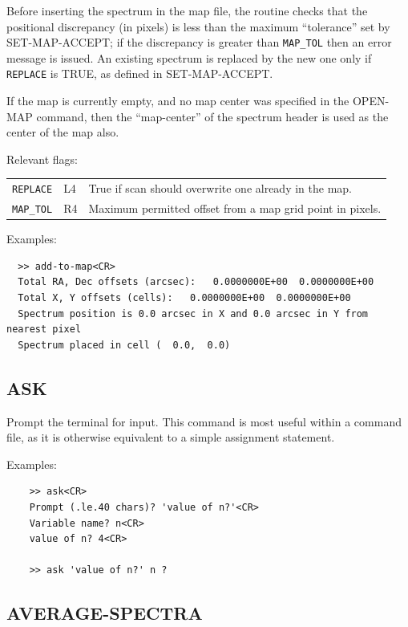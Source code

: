 \documentclass[11pt,twoside]{report}
\begin{document}
Before inserting the spectrum in the map file, the routine checks that the
positional discrepancy (in pixels) is less than the maximum ``tolerance''
set by SET-MAP-ACCEPT; if the discrepancy is greater than \verb+MAP_TOL+
then an error message is issued. An existing spectrum is replaced by the
new one only if \verb+REPLACE+ is TRUE, as defined in SET-MAP-ACCEPT.

If the map is currently empty, and no map center was specified in the
OPEN-MAP command, then the ``map-center'' of the spectrum header is used
as the center of the map also.

Relevant flags:\\
\begin{tabular}{lll}\index{REPLACE@\verb+REPLACE+}\index{MAP_TOL@\verb+MAP_TOL+}
  \verb+REPLACE+ &  L4 & True if scan should overwrite one already in
                            the map. \\
  \verb+MAP_TOL+ &  R4 & Maximum permitted offset from a map grid point
                            in pixels.
\end{tabular}

Examples:
\begin{verbatim}
  >> add-to-map<CR>
  Total RA, Dec offsets (arcsec):   0.0000000E+00  0.0000000E+00
  Total X, Y offsets (cells):   0.0000000E+00  0.0000000E+00
  Spectrum position is 0.0 arcsec in X and 0.0 arcsec in Y from nearest pixel
  Spectrum placed in cell (  0.0,  0.0) 

\end{verbatim}

\subsection{ASK}  

Prompt the terminal for input. This command is most useful within a command
file, as it is otherwise equivalent to a simple assignment statement.

Examples:
\begin{verbatim}
    >> ask<CR>
    Prompt (.le.40 chars)? 'value of n?'<CR>
    Variable name? n<CR>
    value of n? 4<CR>

    >> ask 'value of n?' n ?
\end{verbatim}

\subsection{AVERAGE-SPECTRA}
\end{document}
